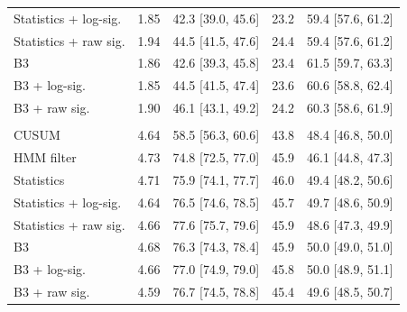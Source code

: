 \begin{tabular}{@{}lcccc@{}}
Statistics + log-sig. & 1.85 & 42.3 [39.0, 45.6] & 23.2 & 59.4 [57.6, 61.2] \\
Statistics + raw sig. & 1.94 & 44.5 [41.5, 47.6] & 24.4 & 59.4 [57.6, 61.2] \\
B3 & 1.86 & 42.6 [39.3, 45.8] & 23.4 & 61.5 [59.7, 63.3] \\
B3 + log-sig. & 1.85 & 44.5 [41.5, 47.4] & 23.6 & 60.6 [58.8, 62.4] \\
B3 + raw sig. & 1.90 & 46.1 [43.1, 49.2] & 24.2 & 60.3 [58.6, 61.9] \\
\addlinespace
\multicolumn{5}{@{}l}{\textit{Target: 5 false alarms per 1,000 observations}} \\
CUSUM & 4.64 & 58.5 [56.3, 60.6] & 43.8 & 48.4 [46.8, 50.0] \\
HMM filter & 4.73 & 74.8 [72.5, 77.0] & 45.9 & 46.1 [44.8, 47.3] \\
Statistics & 4.71 & 75.9 [74.1, 77.7] & 46.0 & 49.4 [48.2, 50.6] \\
Statistics + log-sig. & 4.64 & 76.5 [74.6, 78.5] & 45.7 & 49.7 [48.6, 50.9] \\
Statistics + raw sig. & 4.66 & 77.6 [75.7, 79.6] & 45.9 & 48.6 [47.3, 49.9] \\
B3 & 4.68 & 76.3 [74.3, 78.4] & 45.9 & 50.0 [49.0, 51.0] \\
B3 + log-sig. & 4.66 & 77.0 [74.9, 79.0] & 45.8 & 50.0 [48.9, 51.1] \\
B3 + raw sig. & 4.59 & 76.7 [74.5, 78.8] & 45.4 & 49.6 [48.5, 50.7] \\
\bottomrule
\end{tabular}
